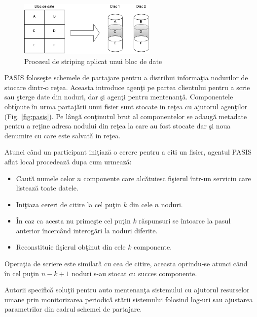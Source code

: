 \documentclass{llncs}
\begin{document}
\begin{figure}
	\label{fig:raid_strip}
	\begin{center}
	\includegraphics[width=0.6\textwidth]{img/raid0.png}
	\caption{Procesul de striping aplicat unui bloc de date}
	\end{center}
	\bigskip
\end{figure}

PASIS folose\c{s}te schemele de partajare pentru a distribui informa\c{t}ia nodurilor de stocare dintr-o re\c{t}ea. Aceasta introduce agen\c{t}i pe partea clientului pentru a scrie sau \c{s}terge date din noduri, dar \c{s}i agen\c{t}i pentru mentenan\c{t}\u{a}. Componentele obt\c{i}nute \^{i}n urma partaj\u{a}rii unui fisier sunt stocate in re\c{t}ea cu ajutorul agen\c{t}ilor (Fig. \ref{fig:pasis}). Pe l\^{a}ng\u{a} con\c{t}inutul brut al componentelor se adaug\u{a} metadate pentru a re\c{t}ine adresa nodului din re\c{t}ea la care au fost stocate dar \c{s}i noua denumire cu care este salvat\u{a} in re\c{t}ea.

Atunci c\^{a}nd un participant ini\c{t}iaz\u{a} o cerere pentru a citi un fisier, agentul PASIS aflat local procedeaz\u{a} dupa cum urmeaz\u{a}:
\begin{itemize}
	\item Caut\u{a} numele celor $n$ componente care alc\u{a}tuiesc fi\c{s}ierul \^{i}ntr-un serviciu care listeaz\u{a} toate datele.
	\item Ini\c{t}iaza cereri de citire la cel pu\c{t}in $k$ din cele $n$ noduri.
	\item \^{I}n caz ca acesta nu prime\c{s}te cel pu\c{t}in $k$ r\u{a}spunsuri se \^{i}ntoarce la pasul anterior \^{i}ncerc\^{a}nd interog\u{a}ri la noduri diferite.
	\item Reconstituie fi\c{s}ierul ob\c{t}inut din cele $k$ componente.
\end{itemize}
Opera\c{t}ia de scriere este similar\u{a} cu cea de citire, aceasta oprindu-se atunci c\^{a}nd \^{i}n cel pu\c{t}in $n - k + 1$ noduri s-au stocat cu succes componente.

Autorii specific\u{a} solu\c{t}ii pentru auto mentenan\c{t}a sistemului cu ajutorul resurselor umane prin monitorizarea periodic\u{a} st\u{a}rii sistemului folosind log-uri sau ajustarea parametrilor din cadrul schemei de partajare.
\end{document}
